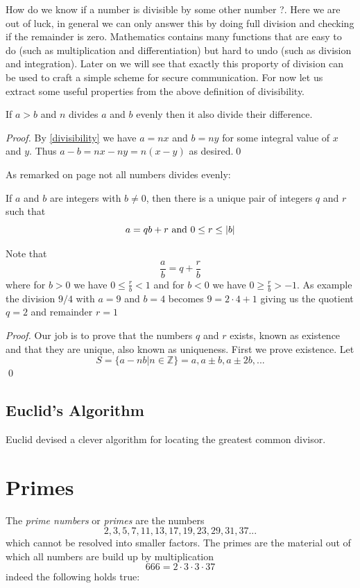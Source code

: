 How do we know if a number is divisible by some other number ?. Here we are out
of luck, in general we can only answer this by doing full division and checking
if the remainder is zero. Mathematics contains many functions that are easy to
do (such as multiplication and differentiation) but hard to undo (such as
division and integration). Later on we will see that exactly this proporty of
division can be used to craft a simple scheme for secure communication. For now
let us extract some useful properties from the above definition of divisibility.
\begin{proposition}
If $a > b$ and $n$ divides $a$ and $b$ evenly then it also divide their
difference.
\end{proposition}
\begin{proof}
By \ref{divisibility} we have $a = nx$ and  $b = ny$ for some integral
value of $x$ and $y$. Thus $a-b = nx - ny = n(x-y)$ as desired.\qed
\end{proof}

As remarked on page \pageref{remainder} not all numbers divides evenly:
\begin{proposition}\label{division_algorithm}
If $a$ and $b$ are integers with $b\neq0$, then there is a unique pair of
integers $q$ and $r$ such that
\[
a = qb+r \textnormal{ and } 0 \leq r \leq |b|
\]
\end{proposition}
Note that
\[
\frac{a}{b} = q + \frac{r}{b}
\]
where for $b>0$ we have $0 \leq \frac{r}{b} < 1$ and for $b<0$ we have
$0 \geq \frac{r}{b} > -1$. As example the division $9/4$ with $a=9$ and $b=4$
becomes $9=2\cdot4 + 1$ giving us the quotient $q=2$ and remainder $r=1$
\begin{proof}
Our job is to prove that the numbers $q$ and $r$ exists, known as existence and
that they are unique, also known as uniqueness. First we prove existence. Let
\[
S = \{a-nb|n \in \mathbb{Z}\} = {a,a \pm b,a \pm 2b,...}
\]
\qed
\end{proof}

\subsection{Euclid's Algorithm}
Euclid devised a clever algorithm for locating the greatest common divisor.

\section{Primes}
The \textit{prime numbers} or \textit{primes} are the numbers
\[
2, 3, 5, 7, 11, 13, 17, 19, 23, 29, 31, 37 ...
\]
which cannot be resolved into smaller factors. The primes are the material out of which
all numbers are build up by multiplication
\[
666 = 2 \cdot 3 \cdot 3 \cdot 37
\]
indeed the following holds true:

